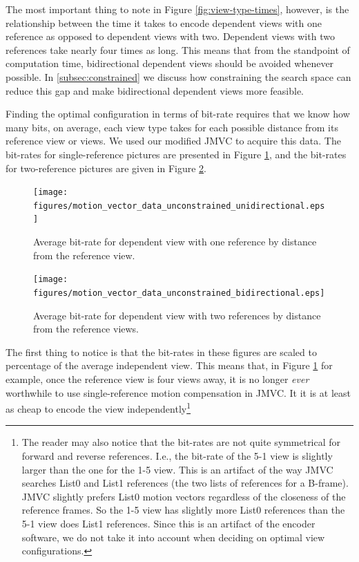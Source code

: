 \documentclass{sig-alternate-05-2015}
\begin{document}
The most important thing to note in Figure \ref{fig:view-type-times}, however,
is the relationship between the time it takes to encode dependent views with one
reference as opposed to dependent views with two. Dependent views with two
references take nearly four times as long. This means that from the standpoint
of computation time, bidirectional dependent views should be avoided whenever
possible. In \ref{subsec:constrained} we discuss how constraining the search
space can reduce this gap and make bidirectional dependent views more feasible.

Finding the optimal configuration in terms of bit-rate requires that we know how
many bits, on average, each view type takes for each possible distance from its
reference view or views. We used our modified JMVC to acquire this data. The
bit-rates for single-reference pictures are presented in Figure
\ref{fig:uniframes}, and the bit-rates for two-reference pictures are given in
Figure \ref{fig:biframes}.

\begin{figure}
\centering
\texttt{[image: figures/motion\_vector\_data\_unconstrained\_unidirectional.eps]}
\caption{
Average bit-rate for dependent view with one reference by distance from the
reference view.
}
\label{fig:uniframes}
\end{figure}

\begin{figure}
\centering
\texttt{[image: figures/motion\_vector\_data\_unconstrained\_bidirectional.eps]}
\caption{
Average bit-rate for dependent view with two references by distance from the
reference views.
}
\label{fig:biframes}
\end{figure}

The first thing to notice is that the bit-rates in these figures are scaled to
percentage of the average independent view. This means that, in Figure
\ref{fig:uniframes} for example, once the reference view is four views away,
it is no longer {\it ever} worthwhile to use single-reference motion
compensation in JMVC. It it is at least as cheap to encode the view
independently\footnote{The reader may also notice that the bit-rates are not
quite symmetrical for forward and reverse references. I.e., the bit-rate of
the 5-1 view is slightly larger than the one for the 1-5 view. This is an
artifact of the way JMVC searches List0 and List1 references (the two lists
of references for a B-frame). JMVC slightly prefers List0 motion vectors
regardless of the closeness of the reference frames. So the 1-5 view has
slightly more List0 references than the 5-1 view does List1 references. Since
this is an artifact of the encoder software, we do not take it into account when
deciding on optimal view configurations.}
\end{document}
